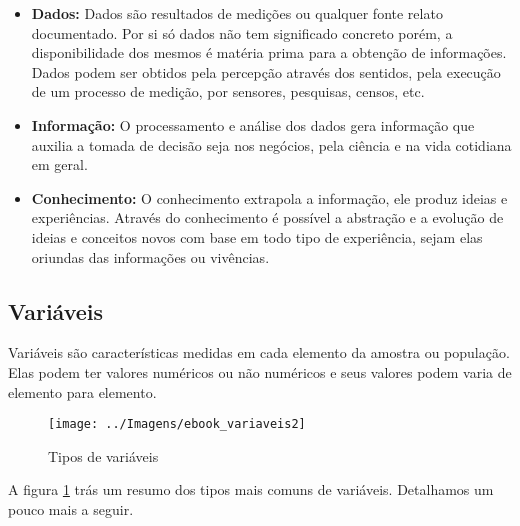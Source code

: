 \documentclass[12pt,]{style/krantz}
\theoremstyle{definition}
\theoremstyle{definition}
\theoremstyle{definition}
\theoremstyle{remark}
\begin{document}
\begin{itemize}
\item
  \textbf{Dados: }Dados são resultados de medições ou qualquer fonte
  relato documentado. Por si só dados não tem significado concreto
  porém, a disponibilidade dos mesmos é matéria prima para a obtenção de
  informações. Dados podem ser obtidos pela percepção através dos
  sentidos, pela execução de um processo de medição, por sensores,
  pesquisas, censos, etc.
\item
  \textbf{Informação:} O processamento e análise dos dados gera
  informação que auxilia a tomada de decisão seja nos negócios, pela
  ciência e na vida cotidiana em geral.
\item
  \textbf{Conhecimento:} O conhecimento extrapola a informação, ele
  produz ideias e experiências. Através do conhecimento é possível a
  abstração e a evolução de ideias e conceitos novos com base em todo
  tipo de experiência, sejam elas oriundas das informações ou vivências.
\end{itemize}

\subsection{Variáveis}\label{variaveis}

Variáveis são características medidas em cada elemento da amostra ou
população. Elas podem ter valores numéricos ou não numéricos e seus
valores podem varia de elemento para elemento.

\begin{figure}[H]

{\centering \texttt{[image: ../Imagens/ebook\_variaveis2]} 

}

\caption{Tipos de variáveis}\label{fig:fig06}
\end{figure}

A figura \ref{fig:fig06} trás um resumo dos tipos mais comuns de
variáveis. Detalhamos um pouco mais a seguir.
\end{document}
